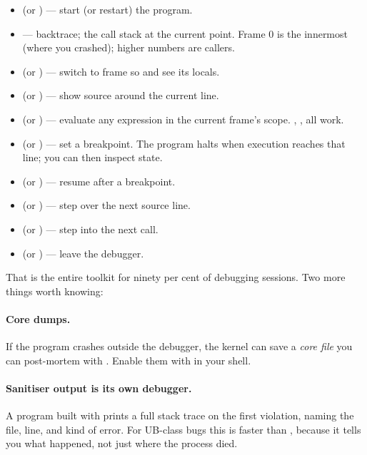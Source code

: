 \begin{itemize}[leftmargin=*]
  \item {} (or ) --- start (or restart) the program.
  \item {} --- backtrace; the call stack at the current
    point. Frame 0 is the innermost (where you crashed); higher
    numbers are callers.
  \item {} (or ) --- switch to frame
     so  and  see its locals.
  \item {} (or ) --- show source around the
    current line.
  \item {} (or ) --- evaluate any \cpp{}
    expression in the current frame's scope. , ,  all work.
  \item {} (or ) --- set a
    breakpoint. The program halts when execution reaches that
    line; you can then inspect state.
  \item {} (or ) --- resume after a breakpoint.
  \item {} (or ) --- step over the next source line.
  \item {} (or ) --- step into the next call.
  \item {} (or ) --- leave the debugger.
\end{itemize}

That is the entire toolkit for ninety per cent of debugging
sessions. Two more things worth knowing:

\paragraph{Core dumps.}
If the program crashes outside the debugger, the kernel can save a
\emph{core file} you can post-mortem with .
Enable them with  in your shell.

\paragraph{Sanitiser output is its own debugger.}
A program built with  prints a
full stack trace on the first violation, naming the file, line,
and kind of error. For UB-class bugs this is faster than
, because it tells you what happened, not just where the
process died.


